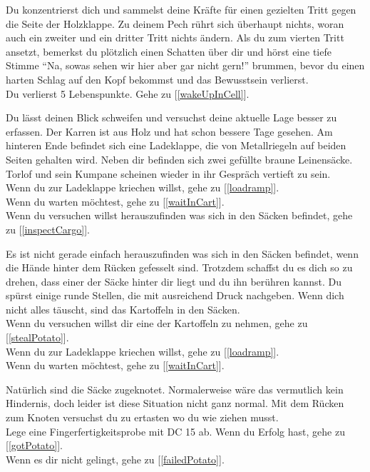 Du konzentrierst dich und sammelst deine Kräfte für einen gezielten Tritt gegen die Seite der Holzklappe. Zu deinem Pech rührt sich überhaupt nichts, woran auch ein zweiter und ein dritter Tritt nichts ändern. Als du zum vierten Tritt ansetzt, bemerkst du plötzlich einen Schatten über dir und hörst eine tiefe Stimme ``Na, sowas sehen wir hier aber gar nicht gern!'' brummen, bevor du einen harten Schlag auf den Kopf bekommst und das Bewusstsein verlierst.\\
Du verlierst 5 Lebenspunkte.
Gehe zu [\ref{wakeUpInCell}].

Du lässt deinen Blick schweifen und versuchst deine aktuelle Lage besser zu erfassen. Der Karren ist aus Holz und hat schon bessere Tage gesehen. Am hinteren Ende befindet sich eine Ladeklappe, die von Metallriegeln auf beiden Seiten gehalten wird. Neben dir befinden sich zwei gefüllte braune Leinensäcke. Torlof und sein Kumpane scheinen wieder in ihr Gespräch vertieft zu sein.
\\Wenn du zur Ladeklappe kriechen willst, gehe zu [\ref{loadramp}].
\\Wenn du warten möchtest, gehe zu [\ref{waitInCart}].
\\Wenn du versuchen willst herauszufinden was sich in den Säcken befindet, gehe zu [\ref{inspectCargo}].


Es ist nicht gerade einfach herauszufinden was sich in den Säcken befindet, wenn die Hände hinter dem Rücken gefesselt sind. Trotzdem schaffst du es dich so zu drehen, dass einer der Säcke hinter dir liegt und du ihn berühren kannst. Du spürst einige runde Stellen, die mit ausreichend Druck nachgeben. Wenn dich nicht alles täuscht, sind das Kartoffeln in den Säcken.
\\Wenn du versuchen willst dir eine der Kartoffeln zu nehmen, gehe zu [\ref{stealPotato}].
\\Wenn du zur Ladeklappe kriechen willst, gehe zu [\ref{loadramp}].
\\Wenn du warten möchtest, gehe zu [\ref{waitInCart}].


Natürlich sind die Säcke zugeknotet. Normalerweise wäre das vermutlich kein Hindernis, doch leider ist diese Situation nicht ganz normal. Mit dem Rücken zum Knoten versuchst du zu ertasten wo du wie ziehen musst.
\\Lege eine Fingerfertigkeitsprobe mit DC 15 ab. Wenn du Erfolg hast, gehe zu [\ref{gotPotato}].
\\Wenn es dir nicht gelingt, gehe zu [\ref{failedPotato}].

